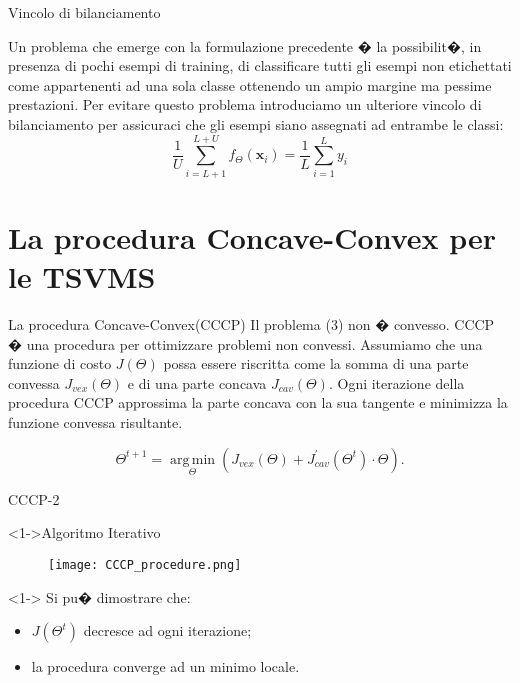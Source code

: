 \documentclass[mathserif]{beamer}
\begin{document}
\begin{frame}{Vincolo di bilanciamento}
\begin{block}{}
Un problema che emerge con la formulazione precedente � la possibilit�, in presenza di pochi esempi di training, di classificare tutti gli esempi non etichettati come appartenenti ad una sola classe ottenendo un ampio margine ma pessime prestazioni. Per evitare questo problema introduciamo un ulteriore vincolo di bilanciamento per assicuraci che gli esempi siano assegnati ad entrambe le classi:
\begin{equation}
	\frac{1}{U} \sum_{i=L+1}^{L+U}{f_{\Theta}(\textbf{x}_i)}=\frac{1}{L} \sum_{i=1}^{L}{y_i}
\end{equation}
\end{block}
\end{frame}

\section{La procedura Concave-Convex per le TSVMS}

\begin{frame}{La procedura Concave-Convex(CCCP)}
Il problema (3) non � convesso. CCCP � una procedura per ottimizzare problemi non convessi. 
Assumiamo che una funzione di costo $J(\Theta)$ possa essere riscritta come la somma di una parte convessa $J_{vex}(\Theta)$ e di una parte concava $J_{cav}(\Theta)$. Ogni iterazione della procedura CCCP approssima la parte concava con la sua tangente e minimizza la funzione convessa risultante.

\begin{equation}
	\Theta^{t+1}=\underset{\Theta}{\operatorname{arg\,min}}(J_{vex}(\Theta)+J_{cav}^{\prime}(\Theta^t)\cdot \Theta).
\end{equation}

\end{frame}


\begin{frame}{CCCP-2}
\begin{block}<1->{Algoritmo Iterativo}
\begin{figure}[htbp]
	\centering
		\texttt{[image: CCCP\_procedure.png]}
	\label{fig:gres}
\end{figure}
\end{block}


\begin{block}<1-> {}
Si pu� dimostrare che:
\begin{itemize}
	\item<1->  $J(\Theta^t)$ decresce ad ogni iterazione;
	\item<1-> la procedura converge ad un minimo locale.
\end{itemize}
\end{block}
\end{frame}
\end{document}
